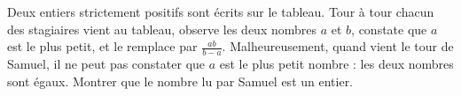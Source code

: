 Deux entiers strictement positifs sont écrits sur le tableau. Tour à tour chacun des stagiaires vient au tableau, observe les deux nombres $a$ et $b$, constate que $a$ est le plus petit, et le remplace par $\frac{ab}{b-a}$. Malheureusement, quand vient le tour de Samuel, il ne peut pas constater que $a$ est le plus petit nombre : les deux nombres sont égaux. Montrer que le nombre lu par Samuel est un entier.
